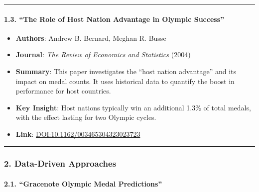 \begin{enumerate}
\begin{description}
\begin{center}\rule{0.5\linewidth}{0.5pt}\end{center}

\hypertarget{the-role-of-host-nation-advantage-in-olympic-success}{%
\paragraph{\texorpdfstring{\textbf{1.3. ``The Role of Host Nation
Advantage in Olympic
Success''}}{1.3. ``The Role of Host Nation Advantage in Olympic Success''}}\label{the-role-of-host-nation-advantage-in-olympic-success}}

\begin{itemize}
\item
  \textbf{Authors}: Andrew B. Bernard, Meghan R. Busse
\item
  \textbf{Journal}: \emph{The Review of Economics and Statistics} (2004)
\item
  \textbf{Summary}: This paper investigates the ``host nation
  advantage'' and its impact on medal counts. It uses historical data to
  quantify the boost in performance for host countries.
\item
  \textbf{Key Insight}: Host nations typically win an additional 1.3\%
  of total medals, with the effect lasting for two Olympic cycles.
\item
  \textbf{Link}:
  \href{https://doi.org/10.1162/003465304323023723}{DOI:10.1162/003465304323023723}
\end{itemize}

\begin{center}\rule{0.5\linewidth}{0.5pt}\end{center}

\hypertarget{data-driven-approaches}{%
\subsubsection*{\texorpdfstring{\textbf{2. Data-Driven
Approaches}}{2. Data-Driven Approaches}}\label{data-driven-approaches}}

\hypertarget{gracenote-olympic-medal-predictions}{%
\paragraph{\texorpdfstring{\textbf{2.1. ``Gracenote Olympic Medal
Predictions''}}{2.1. ``Gracenote Olympic Medal Predictions''}}\label{gracenote-olympic-medal-predictions}}


\end{description}
\end{enumerate}

